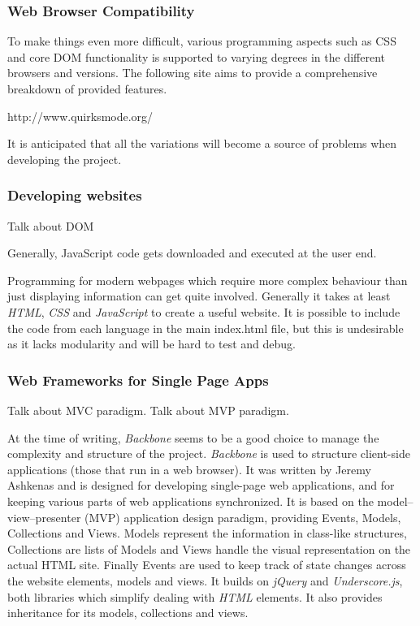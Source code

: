\documentclass[a4paper,11pt,titlepage]{article}
\begin{document}
\subsubsection{Web Browser Compatibility}

To make things even more difficult, various programming aspects such as CSS and core DOM functionality is supported to varying degrees in the different browsers and versions. The following site aims to provide a comprehensive breakdown of provided features.

http://www.quirksmode.org/

It is anticipated that all the variations will become a source of problems when developing the project.



\subsubsection{Developing websites}

Talk about DOM


Generally, JavaScript code gets downloaded and executed at the user end.


Programming for modern webpages which require more complex behaviour than just displaying information can get quite involved. Generally it takes at least \textit{HTML}, \textit{CSS} and \textit{JavaScript} to create a useful website. It is possible to include the code from each language in the main index.html file, but this is undesirable as it lacks modularity and will be hard to test and debug.



\subsubsection{Web Frameworks for Single Page Apps}

Talk about MVC paradigm. Talk about MVP paradigm.

At the time of writing, \textit{Backbone} seems to be a good choice to manage the complexity and structure of the project. \textit{Backbone} is used to structure client-side applications (those that run in a web browser). It was written by Jeremy Ashkenas and is designed for developing single-page web applications, and for keeping various parts of web applications synchronized. It is based on the model–view–presenter (MVP) application design paradigm, providing Events, Models, Collections and Views. Models represent the information in class-like structures, Collections are lists of Models and Views handle the visual representation on the actual HTML site. Finally Events are used to keep track of state changes across the website elements, models and views. It builds on \textit{jQuery} and \textit{Underscore.js}, both libraries which simplify dealing with \textit{HTML} elements. It also provides inheritance for its models, collections and views.
\end{document}
